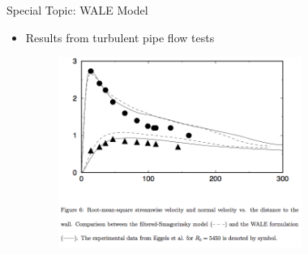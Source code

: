 \begin{frame}{Special Topic: WALE Model}
\begin{itemize}
	\item Results from turbulent pipe flow tests
	\begin{figure}
		\includegraphics[width=0.75\textwidth]{wale5}
	\end{figure}
\end{itemize}
\end{frame}






